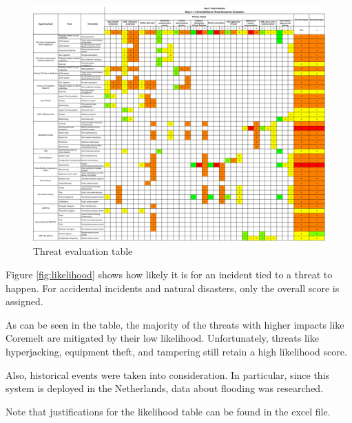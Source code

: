 \begin{figure}[h!]
    \centering
    \includegraphics[keepaspectratio,width=1\textwidth]{03-risk-analysis/003-TE/img/threatEval.pdf}
    \caption{Threat evaluation table}
    \label{fig:threatsEval}
\end{figure}

\newpage

Figure \ref{fig:likelihood} shows how likely it is for an incident tied to a threat to happen. For accidental incidents and natural disasters, only the overall score is assigned.

As can be seen in the table, the majority of the threats with higher impacts like Coremelt are mitigated by their low likelihood. Unfortunately, threats like hyperjacking, equipment theft, and tampering still retain a high likelihood score.

Also, historical events were taken into consideration. In particular, since this system is deployed in the Netherlands, data about flooding was researched\cite{online:flooding}.

Note that justifications for the likelihood table can be found in the excel file.

